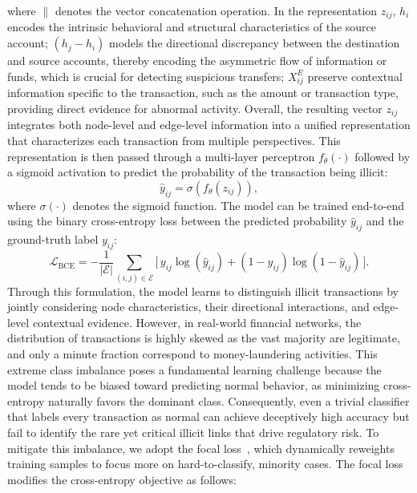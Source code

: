 where $\|$ denotes the vector concatenation operation. In the representation $z_{ij}$, $h_i$ encodes the intrinsic behavioral and structural characteristics of the source account; $(h_j - h_i)$ models the directional discrepancy between the destination and source accounts, thereby encoding the asymmetric flow of information or funds, which is crucial for detecting suspicious transfers; $X^E_{ij}$ preserve contextual information specific to the transaction, such as the amount or transaction type, providing direct evidence for abnormal activity. Overall, the resulting vector $z_{ij}$ integrates both node-level and edge-level information into a unified representation that characterizes each transaction from multiple perspectives. This representation is then passed through a multi-layer perceptron $f_{\theta}(\cdot)$ followed by a sigmoid activation to predict the probability of the transaction being illicit:
\begin{equation}
    \hat{y}_{ij} = \sigma ( f_\theta(z_{ij})),
\end{equation}
where $\sigma(\cdot)$ denotes the sigmoid function. The model can be trained end-to-end using the binary cross-entropy loss between the predicted probability $\hat{y}_{ij}$ and the ground-truth label $y_{ij}$:
\begin{equation}
    \mathcal{L}_{\text{BCE}} = - \frac{1}{|\mathcal{E}|} \sum_{(i,j) \in \mathcal{E}} \Big[\, y_{ij} \log(\hat{y}_{ij}) + (1 - y_{ij}) \log(1 - \hat{y}_{ij}) \,\Big].
\end{equation}
Through this formulation, the model learns to distinguish illicit transactions by jointly considering node characteristics, their directional interactions, and edge-level contextual evidence. 
However, in real-world financial networks, the distribution of transactions is highly skewed as the vast majority are legitimate, and only a minute fraction correspond to money-laundering activities. This extreme class imbalance poses a fundamental learning challenge because the model tends to be biased toward predicting normal behavior, as minimizing cross-entropy naturally favors the dominant class. Consequently, even a trivial classifier that labels every transaction as normal can achieve deceptively high accuracy but fail to identify the rare yet critical illicit links that drive regulatory risk. To mitigate this imbalance, we adopt the focal loss~\parencite{lin2017focal}, which dynamically reweights training samples to focus more on hard-to-classify, minority cases. The focal loss modifies the cross-entropy objective as follows:
